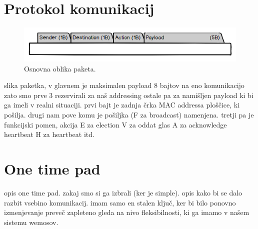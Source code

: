 \documentclass[runningheads]{llncs}
\begin{document}
\section{Protokol komunikacij}
\begin{figure}
  \includegraphics[width=\linewidth]{packet.png}
  \caption{Osnovna oblika paketa.}
  \label{fig:paket}
\end{figure}
slika paketka, v glavnem je maksimalen payload 8 bajtov na eno komunikacijo zato smo prve 3 rezervirali za naš addressing ostale pa za namišljen payload ki bi ga imeli v realni situaciji.
prvi bajt je zadnja črka MAC addressa ploščice, ki pošilja. drugi nam pove komu je pošiljka (F za broadcast) namenjena. tretji pa je funkcijski pomen, akcija E za election V za oddat glas A za acknowledge heartbeat H za heartbeat itd.
\section{One time pad}
opis one time pad. zakaj smo si ga izbrali (ker je simple). opis kako bi se dalo razbit vsebino komunikacij. imam samo en stalen ključ, ker bi bilo ponovno izmenjevanje preveč zapleteno gleda na nivo fleksibilnosti, ki ga imamo v našem sistemu wemosov.
\end{document}
